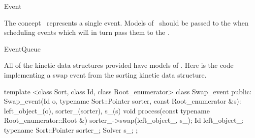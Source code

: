 

\begin{ccRefConcept}{Event}


\ccDefinition
  
The concept \ccClassName\ represents a single event. Models of \ccClassName\ should be passed to the  when scheduling events which will in turn pass them to the .


\ccOperations



\ccHasModels


\ccSeeAlso

EventQueue

\ccExample

All of the kinetic data structures provided have models of
\ccRefName. Here is the code implementing a swap event from the
sorting kinetic data structure.

\begin{ccExampleCode}
template <class Sort, class Id, class Root_enumerator> 
class Swap_event {
public:
  Swap_event(Id o, typename Sort::Pointer sorter, 
	     const Root_enumerator &s): left_object_(o), sorter_(sorter), s_(s){}
  void process(const typename Root_enumerator::Root &){
    sorter_->swap(left_object_, s_);
  }
  Id left_object_; typename Sort::Pointer sorter_; Solver s_;
};
\end{ccExampleCode}


\end{ccRefConcept}



